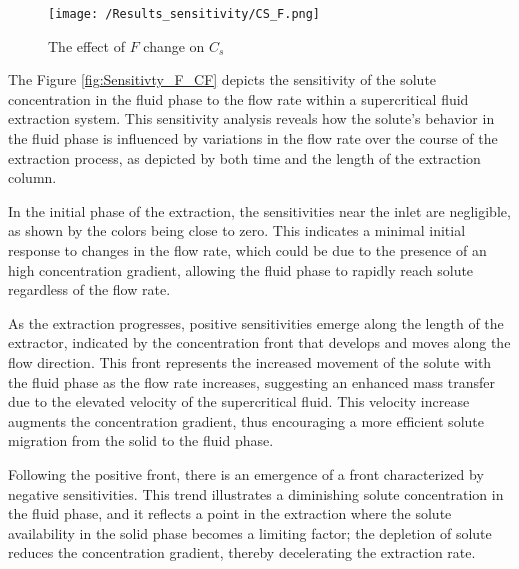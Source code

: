 \documentclass[../Article_Sensitivity_Analsysis.tex]{subfiles}
\begin{document}
    
    \begin{figure}[h!]
    	\centering
    	\texttt{[image: /Results\_sensitivity/CS\_F.png]}
    	\caption{The effect of $F$ change on $C_s$}
    	\label{fig:Sensitivty_F_CS}
    \end{figure}
    
    
    The Figure \ref{fig:Sensitivty_F_CF} depicts the sensitivity of the solute concentration in the fluid phase to the flow rate within a supercritical fluid extraction system. This sensitivity analysis reveals how the solute's behavior in the fluid phase is influenced by variations in the flow rate over the course of the extraction process, as depicted by both time and the length of the extraction column.
    
    In the initial phase of the extraction, the sensitivities near the inlet are negligible, as shown by the colors being close to zero. This indicates a minimal initial response to changes in the flow rate, which could be due to the presence of an high concentration gradient, allowing the fluid phase to rapidly reach solute regardless of the flow rate.
    
    As the extraction progresses, positive sensitivities emerge along the length of the extractor, indicated by the concentration front that develops and moves along the flow direction. This front represents the increased movement of the solute with the fluid phase as the flow rate increases, suggesting an enhanced mass transfer due to the elevated velocity of the supercritical fluid. This velocity increase augments the concentration gradient, thus encouraging a more efficient solute migration from the solid to the fluid phase.
    
    Following the positive front, there is an emergence of a front characterized by negative sensitivities. This trend illustrates a diminishing solute concentration in the fluid phase, and it reflects a point in the extraction where the solute availability in the solid phase becomes a limiting factor; the depletion of solute reduces the concentration gradient, thereby decelerating the extraction rate. 
    
\end{document}
